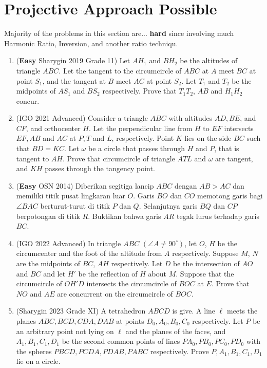 \documentclass[11pt]{scrartcl}
\begin{document}
\section{Projective Approach Possible}
Majority of the problems in this section are... \textbf{hard} since involving much Harmonic Ratio, Inversion, and another ratio techniqu.
\begin{enumerate}
    \item (\textbf{Easy} Sharygin 2019 Grade 11) Let $AH_1$ and $BH_2$ be the altitudes of triangle $ABC$. Let the tangent to the circumcircle of $ABC$ at $A$ meet $BC$ at point $S_1$, and the tangent at $B$ meet $AC$ at point $S_2$. Let $T_1$ and $T_2$ be the midpoints of $AS_1$ and $BS_2$ respectively. Prove that $T_1T_2$, $AB$ and $H_1H_2$ concur.
    
    \item (IGO 2021 Advanced) Consider a triangle $ABC$ with altitudes $AD, BE$, and $CF$, and orthocenter $H$. Let the perpendicular line from $H$ to $EF$ intersects $EF, AB$ and $AC$ at $P, T$ and $L$, respectively. Point $K$ lies on the side $BC$ such that $BD=KC$. Let $\omega$ be a circle that passes through $H$ and $P$, that is tangent to $AH$. Prove that circumcircle of triangle $ATL$ and $\omega$ are tangent, and $KH$ passes through the tangency point.

    \item (\textbf{Easy} OSN 2014) Diberikan segitiga lancip $ABC$ dengan $AB > AC$ dan memiliki titik pusat lingkaran luar $O$. Garis $BO$ dan $CO$ memotong garis bagi $\angle BAC$ berturut-turut di titik $P$ dan $Q$. Selanjutnya garis $BQ$ dan $CP$ berpotongan di titik $R$. Buktikan bahwa garis $AR$ tegak lurus terhadap garis $BC$.

    \item (IGO 2022 Advanced) In triangle $ABC$ $(\angle A\neq 90^\circ)$, let $O$, $H$ be the circumcenter and the foot of the altitude from $A$ respectively. Suppose $M$, $N$ are the midpoints of $BC$, $AH$ respectively. Let $D$ be the intersection of $AO$ and $BC$ and let $H'$ be the reflection of $H$ about $M$. Suppose that the circumcircle of $OH'D$ intersects the circumcircle of $BOC$ at $E$. Prove that $NO$ and $AE$ are concurrent on the circumcircle of $BOC$.

    \item (Sharygin 2023 Grade XI) A tetrahedron $ABCD$ is give. A line $\ell$ meets the planes $ABC,BCD,CDA,DAB$ at points $D_0,A_0,B_0,C_0$ respectively. Let $P$ be an arbitrary point not lying on $\ell$ and the planes of the faces, and $A_1,B_1,C_1,D_1$ be the second common points of lines $PA_0,PB_0,PC_0,PD_0$ with the spheres $PBCD,PCDA,PDAB,PABC$ respectively. Prove $P,A_1,B_1,C_1,D_1$ lie on a circle.
\end{enumerate}
\end{document}
